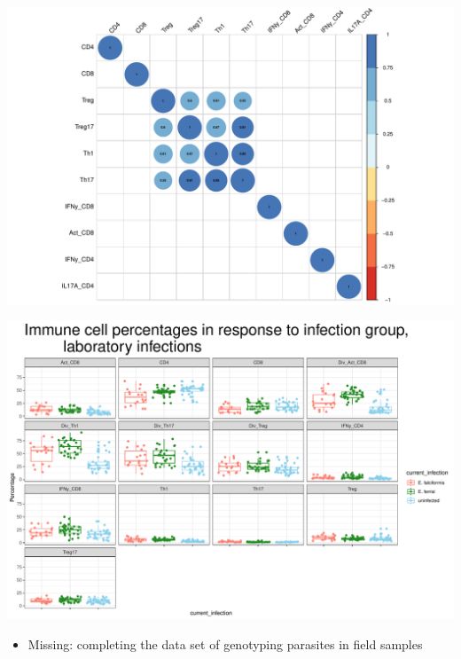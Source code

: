 \documentclass[
]{article}
\providecommand{\tightlist}{%
  \setlength{\itemsep}{0pt}\setlength{\parskip}{0pt}}
\begin{document}
\includegraphics{Explorative_Stats_experimental_planning_files/figure-latex/facs_core_field-1.pdf}

\includegraphics{Explorative_Stats_experimental_planning_files/figure-latex/immune_cells_differences_status-1.pdf}

\begin{itemize}
\tightlist
\item
  Missing: completing the data set of genotyping parasites in field
  samples
\end{itemize}
\end{document}
